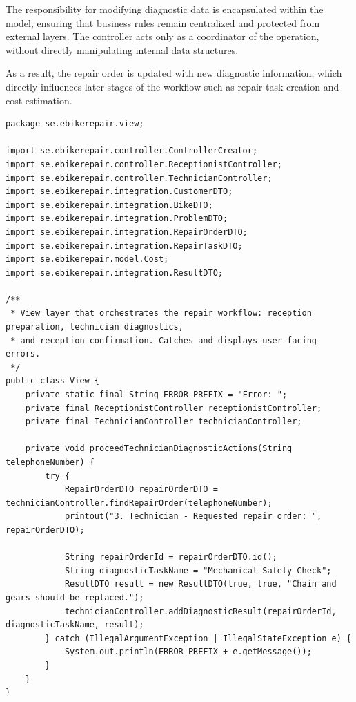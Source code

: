 \documentclass[a4paper]{scrartcl}
\begin{document}
The responsibility for modifying diagnostic data is encapsulated within the model, ensuring that business rules remain centralized and protected from external layers. The controller acts only as a coordinator of the operation, without directly manipulating internal data structures.

As a result, the repair order is updated with new diagnostic information, which directly influences later stages of the workflow such as repair task creation and cost estimation.

\begin{lstlisting}[style=javastyle, caption={Main class entry point}]
package se.ebikerepair.view;

import se.ebikerepair.controller.ControllerCreator;
import se.ebikerepair.controller.ReceptionistController;
import se.ebikerepair.controller.TechnicianController;
import se.ebikerepair.integration.CustomerDTO;
import se.ebikerepair.integration.BikeDTO;
import se.ebikerepair.integration.ProblemDTO;
import se.ebikerepair.integration.RepairOrderDTO;
import se.ebikerepair.integration.RepairTaskDTO;
import se.ebikerepair.model.Cost;
import se.ebikerepair.integration.ResultDTO;

/**
 * View layer that orchestrates the repair workflow: reception preparation, technician diagnostics,
 * and reception confirmation. Catches and displays user-facing errors.
 */
public class View {
    private static final String ERROR_PREFIX = "Error: ";
    private final ReceptionistController receptionistController;
    private final TechnicianController technicianController;

    private void proceedTechnicianDiagnosticActions(String telephoneNumber) {
        try {
            RepairOrderDTO repairOrderDTO = technicianController.findRepairOrder(telephoneNumber);
            printout("3. Technician - Requested repair order: ", repairOrderDTO);

            String repairOrderId = repairOrderDTO.id();
            String diagnosticTaskName = "Mechanical Safety Check";
            ResultDTO result = new ResultDTO(true, true, "Chain and gears should be replaced.");
            technicianController.addDiagnosticResult(repairOrderId, diagnosticTaskName, result);
        } catch (IllegalArgumentException | IllegalStateException e) {
            System.out.println(ERROR_PREFIX + e.getMessage());
        }
    }
}
\end{lstlisting}
\end{document}
